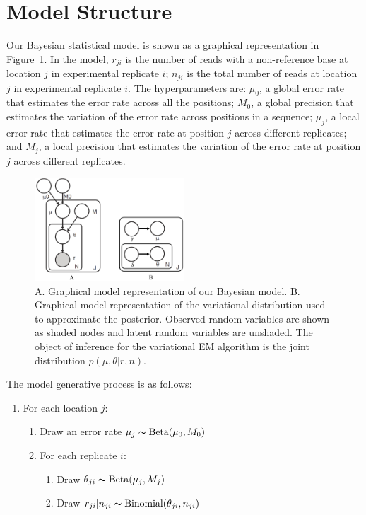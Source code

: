 \documentclass[11pt,reqno]{amsart}
\begin{document}
\section{Model Structure}
Our Bayesian statistical model is shown as a graphical representation in Figure~\ref{tbl:graphical_model}.
In the model, $r_{ji}$ is the number of reads with a non-reference base at location $j$ in experimental replicate $i$; $n_{ji}$ is the total number of reads at location $j$ in experimental replicate $i$.
The hyperparameters are:
$\mu_0$, a global error rate that estimates the error rate across all the positions;
$M_0$, a global precision that estimates the variation of the error rate across positions in a sequence;
$ \mu_j $, a local error rate that estimates the error rate at position $j$ across different replicates;
and $M_j$, a local precision that estimates the variation of the error rate at position $j$ across different replicates.
\begin{figure}[htpb]
\centering
\includegraphics[width=0.5\textwidth]{figs/rvd3_model.png}
\caption{A. Graphical model representation of our Bayesian model.
B. Graphical model representation of the variational distribution used to approximate the posterior.
Observed random variables are shown as shaded nodes and latent random variables are unshaded.
The object of inference for the variational EM algorithm is the joint distribution $p(\mu, \theta|r, n)$.}
\label{tbl:graphical_model}
\end{figure}
The model generative process is as follows:
\begin{enumerate}[noitemsep]
	\item For each location $j$:
	\begin{enumerate}
		\item Draw an error rate $\mu_j \thicksim \text{Beta}(\mu_0, M_0)$
		\item For each replicate $i$:
		\begin{enumerate}
			\item Draw $\theta_{ji} \thicksim \text{Beta}(\mu_j, M_j)$
			\item Draw $r_{ji} | n_{ji} \thicksim \text{Binomial}(\theta_{ji}, n_{ji})$
		\end{enumerate}
	\end{enumerate}
\end{enumerate}
\end{document}

